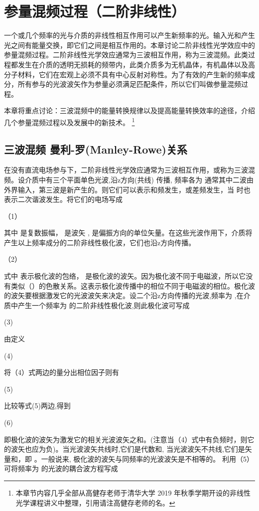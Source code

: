 \section{参量混频过程（二阶非线性）}
一个或几个频率的光与介质的非线性相互作用可以产生新频率的光。输入光和产生光之间有能量交换，即它们之间是相互作用的。本章讨论二阶非线性光学效应中的参量混频过程。二阶非线性光学效应通常为三波相互作用，称为三波混频。此类过程都发生在介质的透明无损耗的频带内，此类介质多为无机晶体，有机晶体以及高分子材料，它们在宏观上必须不具有中心反射对称性。为了有效的产生新的频率成分，所有参与的光波波矢作为参量必须满足匹配条件，所以它们叫做参量混频过程。

本章将重点讨论：三波混频中的能量转换规律以及提高能量转换效率的途径，介绍几个参量混频过程以及发展中的新技术。
\footnote{本章节内容几乎全部从高健存老师于清华大学 2019 年秋季学期开设的非线性光学课程讲义中整理，引用请注高健存老师的名。}

\subsection{三波混频  曼利-罗(Manley-Rowe)关系}
在没有直流电场参与下，二阶非线性光学效应通常为三波相互作用，或称为三波混频。设介质中有三个平面单色光波,沿z方向(共线) 传播, 频率各为 通常其中二波由外界输入，第三波是新产生的。则它们可以表示和频发生，或差频发生，当 时也表示二次谐波发生。将它们的电场写成

    （1）

其中 是复数振幅，  是波矢 , 是偏振方向的单位矢量。在这些光波作用下，介质将产生以上频率成分的二阶非线性极化波，它们也沿z方向传播。

                       （2）

式中 表示极化波的包络， 是极化波的波矢。因为极化波不同于电磁波，所以它没有类似（）的色散关系。这表示极化波传播中的相位不同于电磁波的相位。极化波的波矢要根据激发它的光波波矢来决定。设二个沿z方向传播的光波,频率为 ,在介质中产生一个频率为 的二阶非线性极化波,则此极化波可写成

                              (3)

由定义

             (4)

将（4）式两边的量分出相位因子则有

                (5)

比较等式(5)两边,得到

                                                  (6)        

即极化波的波矢为激发它的相关光波波矢之和。(注意当（4）式中有负频时，则它的波矢也应为负)。当光波波矢共线时,它们是代数和, 当光波波矢不共线,它们是矢量和，即  。一般说来, 极化波的波矢与同频率的光波波矢是不相等的。
利用（5）可将频率为 的光波的耦合波方程写成

